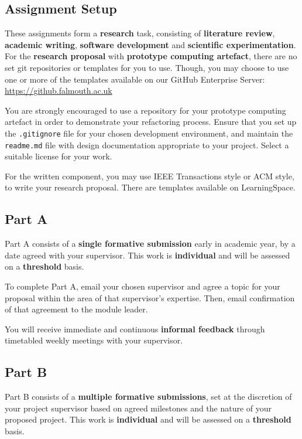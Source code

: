 \subsection*{Assignment Setup}

These assignments form a \textbf{research} task, consisting of \textbf{literature review}, \textbf{academic writing},
\textbf{software development} and \textbf{scientific experimentation}. For the \textbf{research proposal} with \textbf{prototype computing artefact}, there are no set git repositories or templates for you to use. Though, you may choose to use one or more of the templates available on our GitHub Enterprise Server: \indent \url{https://github.falmouth.ac.uk}

You are strongly encouraged to use a repository for your prototype computing artefact in order to demonstrate your refactoring process. Ensure that you set up the \texttt{.gitignore} file for your chosen development environment, and maintain the \texttt{readme.md} file with design documentation appropriate to your project. Select a suitable license for your work.

For the written component, you may use IEEE Transactions style or ACM style, to write your research proposal. There are templates available on LearningSpace.

\subsection*{Part A}

Part A consists of a \textbf{single formative submission} early in academic year, by a date agreed with your supervisor.
This work is \textbf{individual} and will be assessed on a \textbf{threshold} basis.

To complete Part A, email your chosen supervisor and agree a topic for your proposal within the area of that
supervisor's expertise. Then, email confirmation of that agreement to the module leader.

You will receive immediate and continuous \textbf{informal feedback} through timetabled weekly meetings with your supervisor.

\subsection*{Part B}

Part B consists of a \textbf{multiple formative submissions},
set at the discretion of your project supervisor based on agreed milestones and the nature of your proposed project.
This work is \textbf{individual} and will be assessed on a \textbf{threshold} basis.

